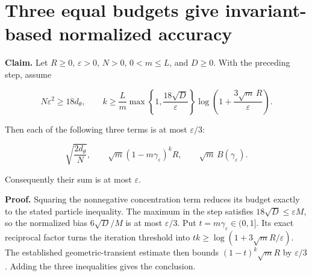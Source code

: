 \documentclass[11pt,a4paper]{article}
\begin{document}
\section{\texorpdfstring{Three equal budgets give invariant-based normalized accuracy}{Three equal budgets give invariant-based normalized accuracy}}


\textbf{Claim.} Let \(R\ge0\), \(\varepsilon>0\), \(N>0\), \(0<m\le L\), and \(D\ge0\). With the preceding step, assume

\[N\varepsilon^2\ge18d_\theta,\qquad k\ge\frac Lm\max\!\left\{1,\frac{18\sqrt D}{\varepsilon}\right\}\log\!\left(1+\frac{3\sqrt m\,R}{\varepsilon}\right).\]


Then each of the following three terms is at most \(\varepsilon/3\):

\[\sqrt{\frac{2d_\theta}{N}},\qquad \sqrt m(1-m\gamma_\varepsilon)^kR,\qquad \sqrt m\,B(\gamma_\varepsilon).\]


Consequently their sum is at most \(\varepsilon\).




\textbf{Proof.} Squaring the nonnegative concentration term reduces its budget exactly to the stated particle inequality. The maximum in the step satisfies \(18\sqrt D\le\varepsilon M\), so the normalized bias \(6\sqrt D/M\) is at most \(\varepsilon/3\). Put \(t=m\gamma_\varepsilon\in(0,1]\). Its exact reciprocal factor turns the iteration threshold into \(tk\ge\log(1+3\sqrt mR/\varepsilon)\). The established geometric-transient estimate then bounds \((1-t)^k\sqrt mR\) by \(\varepsilon/3\). Adding the three inequalities gives the conclusion.
\end{document}
